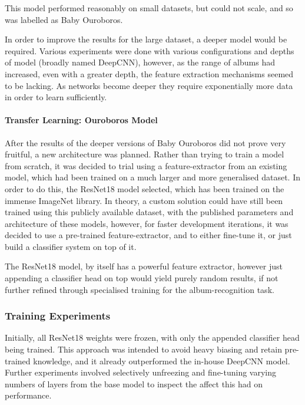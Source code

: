                 This model performed reasonably on small datasets, but could not scale, and so was labelled as Baby Ouroboros.
    
                In order to improve the results for the large dataset, a deeper model would be required. Various experiments were done with various configurations and depths of model (broadly named DeepCNN), however, as the range of albums had increased, even with a greater depth, the feature extraction mechanisms seemed to be lacking. As networks become deeper they require exponentially more data in order to learn sufficiently.
    
                \paragraph{Transfer Learning: Ouroboros Model}
    
                After the results of the deeper versions of Baby Ouroboros did not prove very fruitful, a new architecture was planned. Rather than trying to train a model from scratch, it was decided to trial using a feature-extractor from an existing model, which had been trained on a much larger and more generalised dataset. In order to do this, the ResNet18 model selected, which has been trained on the immense ImageNet library. In theory, a custom solution could have still been trained using this publicly available dataset, with the published parameters and architecture of these models, however, for faster development iterations, it was decided to use a pre-trained feature-extractor, and to either fine-tune it, or just build a classifier system on top of it.
    
                The ResNet18 model, by itself has a powerful feature extractor, however just appending a classifier head on top would yield purely random results, if not further refined through specialised training for the album-recognition task.
    
                \subsubsection{Training Experiments}
    
                    Initially, all ResNet18 weights were frozen, with only the appended classifier head being trained. This approach was intended to avoid heavy biasing and retain pre-trained knowledge, and it already outperformed the in-house DeepCNN model. Further experiments involved selectively unfreezing and fine-tuning varying numbers of layers from the base model to inspect the affect this had on performance.
    
